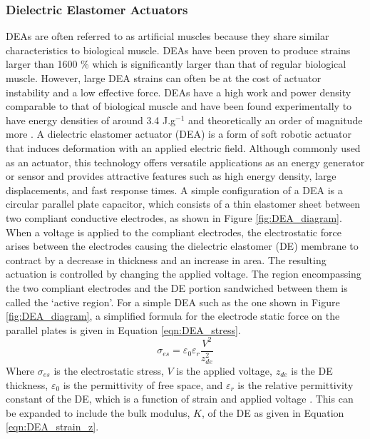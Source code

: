 	\subsubsection{Dielectric Elastomer Actuators}
	\label{subsubsec:deas}
	DEAs are often referred to as artificial muscles because they share similar characteristics to biological muscle. DEAs have been proven to produce strains larger than 1600 \%\cite{Keplinger2012} which is significantly larger than that of regular biological muscle. However, large DEA strains can often be at the cost of actuator instability and a low effective force. DEAs have a high work and power density comparable to that of biological muscle and have been found experimentally to have energy densities of around 3.4 J.g$^{-1}$ and theoretically an order of magnitude more\cite{Liu2009, Koh2009} . A dielectric elastomer actuator (DEA) is a form of soft robotic actuator that induces deformation with an applied electric field. Although commonly used as an actuator, this technology offers versatile applications as an energy generator\cite{McKnight2002, Carpi2008, Koh2009} or sensor and provides attractive features such as high energy density, large displacements, and fast response times. A simple configuration of a DEA is a circular parallel plate capacitor, which consists of a thin elastomer sheet between two compliant conductive electrodes, as shown in Figure \ref{fig:DEA_diagram}. When a voltage is applied to the compliant electrodes, the electrostatic force arises between the electrodes causing the dielectric elastomer (DE) membrane to contract by a decrease in thickness and an increase in area. The resulting actuation is controlled by changing the applied voltage. The region encompassing the two compliant electrodes and the DE portion sandwiched between them is called the `active region'. For a simple DEA such as the one shown in Figure \ref{fig:DEA_diagram}, a simplified formula for the electrode static force on the parallel plates is given in Equation \ref{eqn:DEA_stress}.
	\begin{equation}
		\sigma_{es} = \varepsilon_0 \varepsilon_r \frac{V^2}{z_{de}^2}
		\label{eqn:DEA_stress}
	\end{equation}
	Where $\sigma_{es}$ is the electrostatic stress, $V$ is the applied voltage, $z_{de}$ is the DE thickness, $\varepsilon_0$ is the permittivity of free space, and $\varepsilon_r$ is the relative permittivity constant of the DE, which is a function of strain\cite{Kofod2003, Choi2005, Wissler2007} and applied voltage\cite{Rosset2013} . This can be expanded to include the bulk modulus, $K$, of the DE as given in Equation \ref{eqn:DEA_strain_z}.
